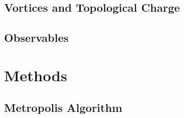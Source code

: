 \documentclass[11pt,a4paper]{article}
\begin{document}
\subsection{Vortices and Topological Charge}
\label{sec:vortices_theory}


\subsection{Observables}
\label{sec:observables}


\section{Methods}
\label{sec:methods}

\subsection{Metropolis Algorithm}
\label{sec:metropolis}

\end{document}
